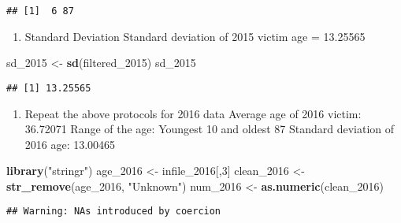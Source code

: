 \documentclass[
]{article}
\newenvironment{Shaded}{\begin{snugshade}}{\end{snugshade}}
\newcommand{\DecValTok}[1]{\textcolor[rgb]{0.00,0.00,0.81}{#1}}
\newcommand{\KeywordTok}[1]{\textcolor[rgb]{0.13,0.29,0.53}{\textbf{#1}}}
\newcommand{\NormalTok}[1]{#1}
\newcommand{\StringTok}[1]{\textcolor[rgb]{0.31,0.60,0.02}{#1}}
\providecommand{\tightlist}{%
  \setlength{\itemsep}{0pt}\setlength{\parskip}{0pt}}
\begin{document}
\begin{verbatim}
## [1]  6 87
\end{verbatim}

\begin{enumerate}
\def\labelenumi{\arabic{enumi}.}
\setcounter{enumi}{2}
\tightlist
\item
  Standard Deviation Standard deviation of 2015 victim age = 13.25565
\end{enumerate}

\begin{Shaded}
\begin{Highlighting}[]
\NormalTok{sd_}\DecValTok{2015}\NormalTok{ <-}\StringTok{ }\KeywordTok{sd}\NormalTok{(filtered_}\DecValTok{2015}\NormalTok{)}
\NormalTok{sd_}\DecValTok{2015}
\end{Highlighting}
\end{Shaded}

\begin{verbatim}
## [1] 13.25565
\end{verbatim}

\begin{enumerate}
\def\labelenumi{\arabic{enumi}.}
\setcounter{enumi}{3}
\tightlist
\item
  Repeat the above protocols for 2016 data Average age of 2016 victim:
  36.72071 Range of the age: Youngest 10 and oldest 87 Standard
  deviation of 2016 age: 13.00465
\end{enumerate}

\begin{Shaded}
\begin{Highlighting}[]
\KeywordTok{library}\NormalTok{(}\StringTok{"stringr"}\NormalTok{)}
\NormalTok{age_}\DecValTok{2016}\NormalTok{ <-}\StringTok{ }\NormalTok{infile_}\DecValTok{2016}\NormalTok{[,}\DecValTok{3}\NormalTok{]}
\NormalTok{clean_}\DecValTok{2016}\NormalTok{ <-}\StringTok{ }\KeywordTok{str_remove}\NormalTok{(age_}\DecValTok{2016}\NormalTok{, }\StringTok{"Unknown"}\NormalTok{)}
\NormalTok{num_}\DecValTok{2016}\NormalTok{ <-}\StringTok{ }\KeywordTok{as.numeric}\NormalTok{(clean_}\DecValTok{2016}\NormalTok{)}
\end{Highlighting}
\end{Shaded}

\begin{verbatim}
## Warning: NAs introduced by coercion
\end{verbatim}
\end{document}
